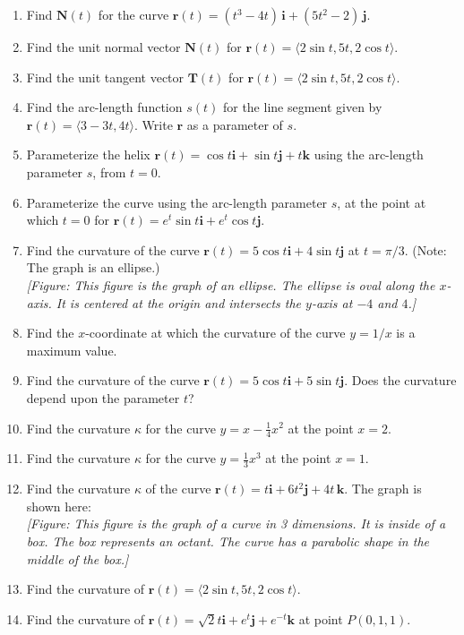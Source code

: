 \documentclass{exercises}
\begin{document}
\begin{enumerate}[start=1]
\item Find $\mathbf{N}(t)$ for the curve $\mathbf{r}(t)=(t^{3}-4t)\,\mathbf{i}+(5t^{2}-2)\,\mathbf{j}$.
\item Find the unit normal vector $\mathbf{N}(t)$ for $\mathbf{r}(t)=\langle2\sin t,5t,2\cos t\rangle$.
\item Find the unit tangent vector $\mathbf{T}(t)$ for $\mathbf{r}(t)=\langle2\sin t,5t,2\cos t\rangle$.
\item Find the arc-length function $s(t)$ for the line segment given by $\mathbf{r}(t)=\langle3-3t,4t\rangle$. Write $\mathbf{r}$ as a parameter of $s$.
\item Parameterize the helix $\mathbf{r}(t)=\cos t\mathbf{i}+\sin t\mathbf{j}+t\mathbf{k}$ using the arc-length parameter $s$, from $t=0$.
\item Parameterize the curve using the arc-length parameter $s$, at the point at which $t=0$ for $\mathbf{r}(t)=e^{t}\sin t\mathbf{i}+e^{t}\cos t\mathbf{j}$.
\item Find the curvature of the curve $\mathbf{r}(t)=5\cos t\mathbf{i}+4\sin t\mathbf{j}$ at $t=\pi/3$. (Note: The graph is an ellipse.) \\ \textit{[Figure: This figure is the graph of an ellipse. The ellipse is oval along the $x$-axis. It is centered at the origin and intersects the $y$-axis at $-4$ and $4$.]}
\item Find the $x$-coordinate at which the curvature of the curve $y=1/x$ is a maximum value.
\item Find the curvature of the curve $\mathbf{r}(t)=5\cos t\mathbf{i}+5\sin t\mathbf{j}$. Does the curvature depend upon the parameter $t$?
\item Find the curvature $\kappa$ for the curve $y=x-\frac{1}{4}x^{2}$ at the point $x=2$.
\item Find the curvature $\kappa$ for the curve $y=\frac{1}{3}x^{3}$ at the point $x=1$.
\item Find the curvature $\kappa$ of the curve $\mathbf{r}(t)=t\mathbf{i}+6t^{2}\mathbf{j}+4t\,\mathbf{k}$. The graph is shown here: \\ \textit{[Figure: This figure is the graph of a curve in 3 dimensions. It is inside of a box. The box represents an octant. The curve has a parabolic shape in the middle of the box.]}
\item Find the curvature of $\mathbf{r}(t)=\langle2\sin t,5t,2\cos t\rangle$.
\item Find the curvature of $\mathbf{r}(t)=\sqrt{2}t\mathbf{i}+e^{t}\mathbf{j}+e^{-t}\mathbf{k}$ at point $P(0,1,1)$.

\end{enumerate}
\end{document}

